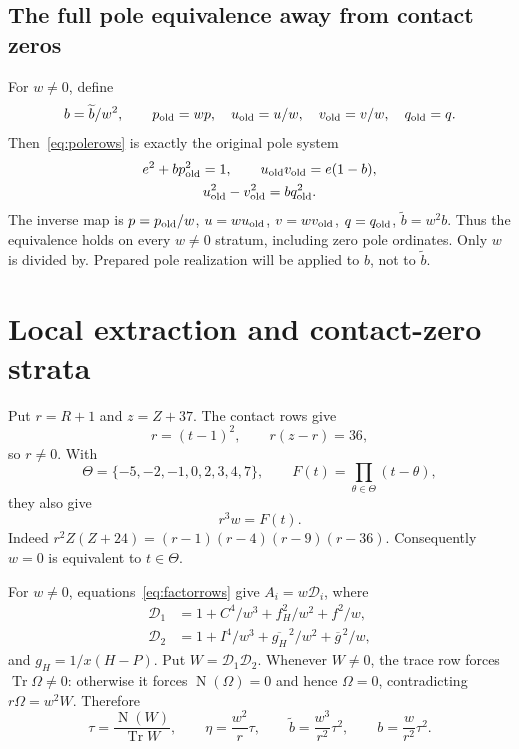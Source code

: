 \documentclass[11pt,a4paper]{article}
\theoremstyle{remark}\newtheorem{remark}[theorem]{Remark}
\DeclareMathOperator{\Tr}{Tr}\DeclareMathOperator{\Nm}{N}
\begin{document}
\subsection{The full pole equivalence away from contact zeros}
For $w\ne0$, define
\begin{equation}\label{eq:polemap}
 b=\widetilde b/w^2,\qquad
 p_{\rm old}=wp,\quad u_{\rm old}=u/w,\quad
 v_{\rm old}=v/w,\quad q_{\rm old}=q.
\end{equation}
Then~\eqref{eq:polerows} is exactly the original pole system
\begin{equation}\label{eq:oldpole}
 \begin{gathered}
 e^2+bp_{\rm old}^2=1,\qquad
 u_{\rm old}v_{\rm old}=e(1-b),\\
 u_{\rm old}^2-v_{\rm old}^2=bq_{\rm old}^2.
 \end{gathered}
\end{equation}
The inverse map is $p=p_{\rm old}/w$, $u=wu_{\rm old}$,
$v=wv_{\rm old}$, $q=q_{\rm old}$, $\widetilde b=w^2b$.
Thus the equivalence holds on every $w\ne0$ stratum, including zero
pole ordinates. Only $w$ is divided by. Prepared pole realization
will be applied to $b$, not to $\widetilde b$.

\section{Local extraction and contact-zero strata}
Put $r=R+1$ and $z=Z+37$. The contact rows give
\[
 r=(t-1)^2,\qquad r(z-r)=36,
\]
so $r\ne0$. With
\[
 \Theta=\{-5,-2,-1,0,2,3,4,7\},\qquad
 F(t)=\prod_{\theta\in\Theta}(t-\theta),
\]
they also give
\begin{equation}\label{eq:weight}
                              r^3w=F(t).
\end{equation}
Indeed $r^2Z(Z+24)=(r-1)(r-4)(r-9)(r-36)$.
Consequently $w=0$ is equivalent to $t\in\Theta$.

For $w\ne0$, equations~\eqref{eq:factorrows} give
$A_i=w\mathcal D_i$, where
\begin{equation}\label{eq:twophysical}
 \begin{split}
 \mathcal D_1&=1+C^4/w^3+f_H^2/w^2+f^2/w,\\
 \mathcal D_2&=1+I^4/w^3+\overline{g_H}^{\,2}/w^2
                                     +\overline g^{\,2}/w,
 \end{split}
\end{equation}
and $g_H=1/x(H-P)$. Put $W=\mathcal D_1\mathcal D_2$.
Whenever $W\ne0$, the trace row forces $\Tr\Omega\ne0$:
otherwise it forces $\Nm(\Omega)=0$ and hence $\Omega=0$,
contradicting $r\Omega=w^2W$. Therefore
\begin{equation}\label{eq:physicalpole}
 \tau=\frac{\Nm(W)}{\Tr W},\qquad
 \eta=\frac{w^2}{r}\tau,\qquad
 \widetilde b=\frac{w^3}{r^2}\tau^2,\qquad
 b=\frac{w}{r^2}\tau^2.
\end{equation}
\end{document}
